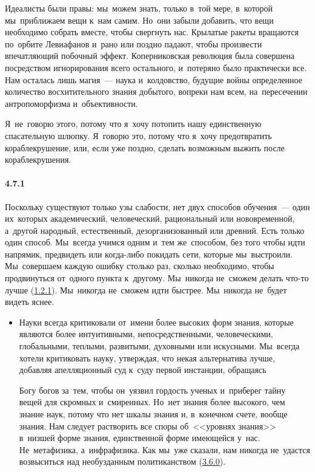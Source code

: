 \begin{itemize}
	Идеалисты были правы: мы~можем знать, только в~той мере, в~которой мы~приближаем вещи к~нам самим. Но~они забыли добавить, что вещи необходимо собрать вместе, чтобы свергнуть нас. Крылатые ракеты вращаются по~орбите Левиафанов и~рано или поздно падают, чтобы произвести впечатляющий побочный эффект. Коперниковская революция была совершена посредством игнорирования всего остального, и~потеряно было практически все. Нам осталась лишь магия~--- наука и~колдовство, будущие войны определенное количество восхитительного знания добытого, вопреки нам всем, на~пересечении антропоморфизма и~объективности.

 Я~не~говорю этого, потому что я~хочу потопить нашу единственную спасательную шлюпку. Я~говорю это, потому что я~хочу предотвратить кораблекрушение, или, если уже поздно, сделать возможным выжить после кораблекрушения.
	\end{itemize}	



\paragraph{4.7.1}\hypertarget{par:4.7.1}{} Поскольку существуют только узы слабости, нет двух способов обучения~--- один их~которых академический, человеческий, рациональный или нововременной, а~другой народный, естественный, дезорганизованный или древний. Есть только один способ. Мы~всегда учимся одним и~тем же~способом, без того чтобы идти напрямик, предвидеть или когда-либо покидать сети, которые мы~выстроили. Мы~совершаем каждую ошибку столько раз, сколько необходимо, чтобы продвинуться от~одного пункта к~другому. Мы~никогда не~сможем делать что-то лучше (\hyperlink{par:1.2.1}{1.2.1}). 
 Мы~никогда не~сможем идти быстрее. Мы~никогда не~будет видеть яснее. 

	\begin{itemize}
	\item 
	Науки всегда критиковали от~имени более высоких форм знания, которые являются более интуитивными, непосредственными, человеческими, глобальными, теплыми, развитыми, духовными или искусными. Мы~всегда хотели критиковать науку, утверждая, что некая альтернатива лучше, добавляя апелляционный суд к~суду первой инстанции, обращаясь 

	Богу богов за~тем, чтобы он~уязвил гордость ученых и~приберег тайну вещей для скромных и~смиренных. Но~нет знания более высокого, чем знание наук, потому что нет шкалы знания и, в~конечном счете, вообще знания. Нам следует растворить все споры об~<<уровнях знания>> в~низшей форме знания, единственной форме имеющейся у~нас. Не~метафизика, а~инфрафизика. Как мы~уже сказали, нам никогда не~удастся возвыситься над необузданным политиканством (\hyperlink{par:3.6.0}{3.6.0}).
	\end{itemize}	


